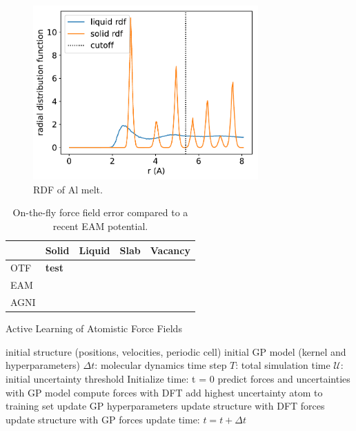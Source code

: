 \documentclass[%
superscriptaddress,
preprint,
amsmath,amssymb,
aps,
prl,
]{revtex4-1}
\begin{document}
\begin{figure}
	\centering
	\includegraphics[width=3.4in]{rdf.pdf}
	\caption{RDF of Al melt.}
\end{figure}

\begin{table}
\begin{tabular}
{ |p{1.4cm}|| >{\centering} p{1.4cm}| >{\centering} p{1.4cm}| >{\centering} p{1.4cm}| p{1.4cm} <{\centering}|  }
	\hline
	 & Solid & Liquid & Slab & Vacancy \\
	\hline
	OTF & \bf{test} & & & \\
	\hline
	EAM & & & & \\
  \hline
	AGNI & & & & \\
	\hline
\end{tabular}
\caption{On-the-fly force field error compared to a recent EAM potential.}
\end{table}

\begin{algorithm}[H]
  \caption{Active Learning of Atomistic Force Fields}
  \label{EPSA}
   \begin{algorithmic}[1]
   \Require initial structure (positions, velocities, periodic cell)
   \Require initial GP model (kernel and hyperparameters)
   \Require $\Delta t$: molecular dynamics time step
   \Require $T$: total simulation time
   \Require $\mathcal{U}$: initial uncertainty threshold
   \State Initialize time: t = 0
   \State predict forces and uncertainties with GP model
   \State compute forces with DFT
   \State add highest uncertainty atom to training set
   \State update GP hyperparameters
   \State update structure with DFT forces
   \Else
   \State update structure with GP forces
   \EndIf
   \State update time: $t = t + \Delta t$
   \EndWhile
   \end{algorithmic}
\end{algorithm}
\end{document}
